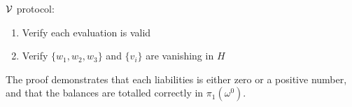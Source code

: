 \begin{Protocol*}[t!]
\begin{framed}
\begin{enumerate}
\end{enumerate}

$\mathcal{V}$ protocol:
\begin{enumerate}
    \item Verify each evaluation is valid
    \item Verify $\{w_1,w_2,w_3\}$ and $\{v_i\}$ are vanishing in $H$
\end{enumerate}





\normalsize	
\end{framed}
\caption{The \pol proof demonstrates that each liabilities is either zero or a positive number, and that the balances are totalled correctly in $\pi_1(\omega^0)$. \label{alg:pol}}
\end{Protocol*}
